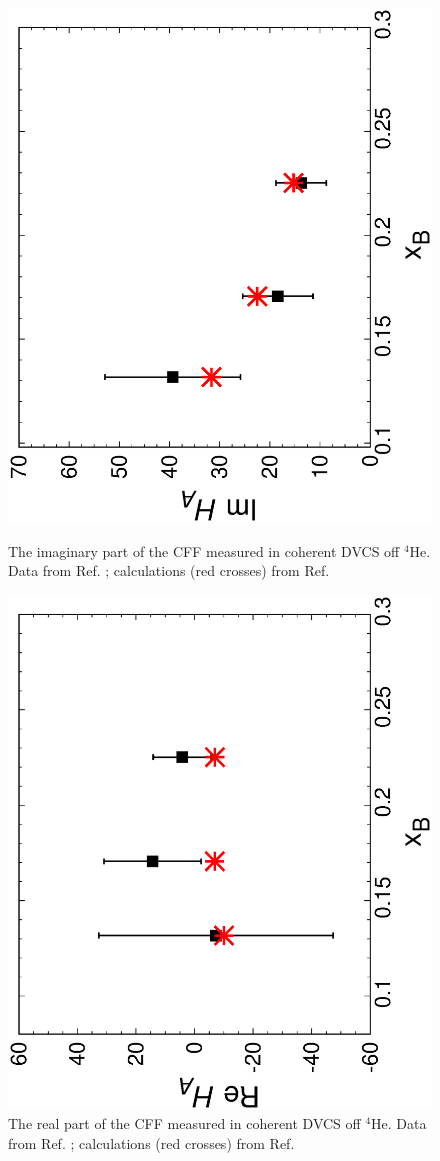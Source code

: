 \documentclass[times, twoside]{PosWhiPap}
\begin{document}
\begin{figure}%
\includegraphics[width=.7\linewidth, angle=270]{Figures/imxb.eps}
\caption{The imaginary part of the CFF measured in coherent DVCS off $^4$He.
Data from Ref. \cite{Hattawy:2017woc}; calculations (red crosses) from
Ref. \cite{Fucini:2018gso}}
\label{uno}
\includegraphics[width=.7\linewidth, angle=270]{Figures/rexb.eps}
\caption{
The real part of the CFF measured in coherent DVCS off $^4$He.
Data from Ref. \cite{Hattawy:2017woc}; calculations (red crosses) from
Ref. \cite{Fucini:2018gso}
}
\label{due}
\end{figure}
\end{document}

